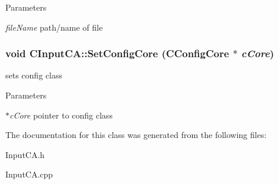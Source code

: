 \begin{DoxyParams}{Parameters}
\item[{\em fileName}]path/name of file \end{DoxyParams}
\hypertarget{classCInputCA_ad951b8c0fedc1570d3155034c9bf0d89}{
\subsubsection[{SetConfigCore}]{\setlength{\rightskip}{0pt plus 5cm}void CInputCA::SetConfigCore ({\bf CConfigCore} $\ast$ {\em cCore})}}
\label{classCInputCA_ad951b8c0fedc1570d3155034c9bf0d89}
sets config class


\begin{DoxyParams}{Parameters}
\item[{\em $\ast$cCore}]pointer to config class \end{DoxyParams}


The documentation for this class was generated from the following files:\begin{DoxyCompactItemize}
\item 
InputCA.h\item 
InputCA.cpp\end{DoxyCompactItemize}
